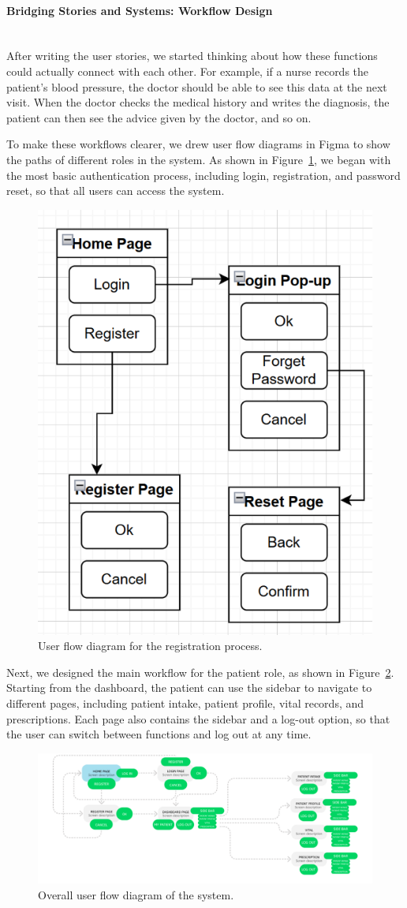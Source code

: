 \paragraph{Bridging Stories and Systems: Workflow Design}\mbox{}\\

After writing the user stories, we started thinking about how these functions could actually connect with each other. For example, if a nurse records the patient’s blood pressure, the doctor should be able to see this data at the next visit. When the doctor checks the medical history and writes the diagnosis, the patient can then see the advice given by the doctor, and so on.

To make these workflows clearer, we drew user flow diagrams in Figma to show the paths of different roles in the system. As shown in Figure~\ref{fig:userflow-registration}, we began with the most basic authentication process, including login, registration, and password reset, so that all users can access the system.

\begin{figure}[H]
   \centering
   \includegraphics[width=0.4\linewidth]{../../images/userflow_registration.png}
   \caption{User flow diagram for the registration process.}
   \label{fig:userflow-registration}
\end{figure}

Next, we designed the main workflow for the patient role, as shown in Figure~\ref{fig:userflow-whole}. Starting from the dashboard, the patient can use the sidebar to navigate to different pages, including patient intake, patient profile, vital records, and prescriptions. Each page also contains the sidebar and a log-out option, so that the user can switch between functions and log out at any time.
\begin{figure}[H]
   \centering
   \includegraphics[width=1.1\linewidth]{../../images/userflow_whole.png}
   \caption{Overall user flow diagram of the system.}
   \label{fig:userflow-whole}
\end{figure}


